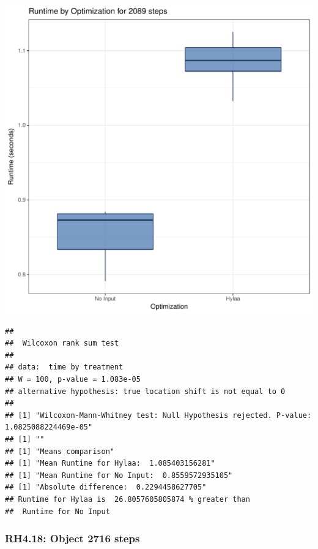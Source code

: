 \documentclass{article}\usepackage[]{graphicx}\usepackage[]{color}
\makeatletter
\def\maxwidth{ %
  \ifdim\Gin@nat@width>\linewidth
    \linewidth
  \else
    \Gin@nat@width
  \fi
}
\newenvironment{kframe}{%
 \def\at@end@of@kframe{}%
 \ifinner\ifhmode%
  \def\at@end@of@kframe{\end{minipage}}%
  \begin{minipage}{\columnwidth}%
 \fi\fi%
 \def\FrameCommand##1{\hskip\@totalleftmargin \hskip-\fboxsep
 \colorbox{shadecolor}{##1}\hskip-\fboxsep
     \hskip-\linewidth \hskip-\@totalleftmargin \hskip\columnwidth}%
 \MakeFramed {\advance\hsize-\width
   \@totalleftmargin\z@ \linewidth\hsize
   \@setminipage}}%
 {\par\unskip\endMakeFramed%
 \at@end@of@kframe}
\newenvironment{knitrout}{}{} %
\makeatother
\begin{document}
\begin{knitrout}
\color{fgcolor}
\includegraphics[width=\maxwidth]{figure/RH4_steps2089-1} 
\begin{kframe}\begin{verbatim}
## 
## 	Wilcoxon rank sum test
## 
## data:  time by treatment
## W = 100, p-value = 1.083e-05
## alternative hypothesis: true location shift is not equal to 0
## 
## [1] "Wilcoxon-Mann-Whitney test: Null Hypothesis rejected. P-value: 1.0825088224469e-05"
## [1] ""
## [1] "Means comparison"
## [1] "Mean Runtime for Hylaa:  1.085403156281"
## [1] "Mean Runtime for No Input:  0.8559572935105"
## [1] "Absolute difference:  0.2294458627705"
## Runtime for Hylaa is  26.8057605805874 % greater than 
##  Runtime for No Input
\end{verbatim}
\end{kframe}
\end{knitrout}


\subsubsection{RH4.18: Object 2716 steps}
\end{document}
